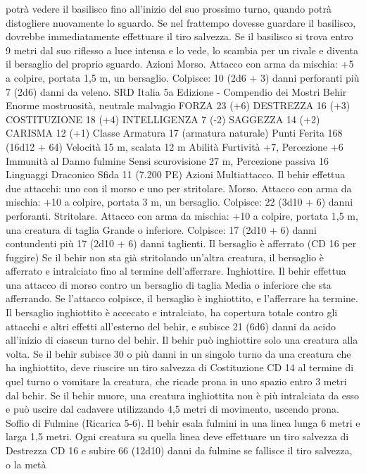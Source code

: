 \begin{multicols}{2}
potrà vedere il basilisco fino all’inizio del suo prossimo turno,
quando potrà distogliere nuovamente lo sguardo. Se nel
frattempo dovesse guardare il basilisco, dovrebbe
immediatamente effettuare il tiro salvezza.
Se il basilisco si trova entro 9 metri dal suo riflesso a luce intensa
e lo vede, lo scambia per un rivale e diventa il bersaglio del
proprio sguardo.
Azioni
Morso. Attacco con arma da mischia: +5 a colpire, portata 1,5
m, un bersaglio.
Colpisce: 10 (2d6 + 3) danni perforanti più 7 (2d6) danni da veleno.
SRD Italia 5a Edizione - Compendio dei Mostri
Behir
Enorme mostruosità, neutrale malvagio
FORZA 23 (+6)
DESTREZZA 16 (+3)
COSTITUZIONE 18 (+4)
INTELLIGENZA 7 (-2)
SAGGEZZA 14 (+2)
CARISMA 12 (+1)
Classe Armatura 17 (armatura naturale)
Punti Ferita 168 (16d12 + 64)
Velocità 15 m, scalata 12 m
Abilità Furtività +7, Percezione +6
Immunità al Danno fulmine
Sensi scurovisione 27 m, Percezione passiva 16
Linguaggi Draconico
Sfida 11 (7.200 PE)
Azioni
Multiattacco. Il behir effettua due attacchi: uno con il morso e
uno per stritolare.
Morso. Attacco con arma da mischia: +10 a colpire, portata 3 m,
un bersaglio.
Colpisce: 22 (3d10 + 6) danni perforanti.
Stritolare. Attacco con arma da mischia: +10 a colpire, portata
1,5 m, una creatura di taglia Grande o inferiore.
Colpisce: 17 (2d10 + 6) danni contundenti più 17 (2d10 + 6)
danni taglienti. Il bersaglio è afferrato (CD 16 per fuggire) Se il
behir non sta già stritolando un’altra creatura, il bersaglio è
afferrato e intralciato fino al termine dell’afferrare.
Inghiottire. Il behir effettua una attacco di morso contro un
bersaglio di taglia Media o inferiore che sta afferrando. Se
l’attacco colpisce, il bersaglio è inghiottito, e l’afferrare ha
termine. Il bersaglio inghiottito è accecato e intralciato, ha
copertura totale contro gli attacchi e altri effetti all’esterno del
behir, e subisce 21 (6d6) danni da acido all’inizio di ciascun
turno del behir. Il behir può inghiottire solo una creatura alla
volta.
Se il behir subisce 30 o più danni in un singolo turno da una
creatura che ha inghiottito, deve riuscire un tiro salvezza di
Costituzione CD 14 al termine di quel turno o vomitare la
creatura, che ricade prona in uno spazio entro 3 metri dal behir.
Se il behir muore, una creatura inghiottita non è più intralciata da
esso e può uscire dal cadavere utilizzando 4,5 metri di
movimento, uscendo prona.
Soffio di Fulmine (Ricarica 5-6). Il behir esala fulmini in una
linea lunga 6 metri e larga 1,5 metri. Ogni creatura su quella
linea deve effettuare un tiro salvezza di Destrezza CD 16 e subire
66 (12d10) danni da fulmine se fallisce il tiro salvezza, o la metà

\end{multicols}
